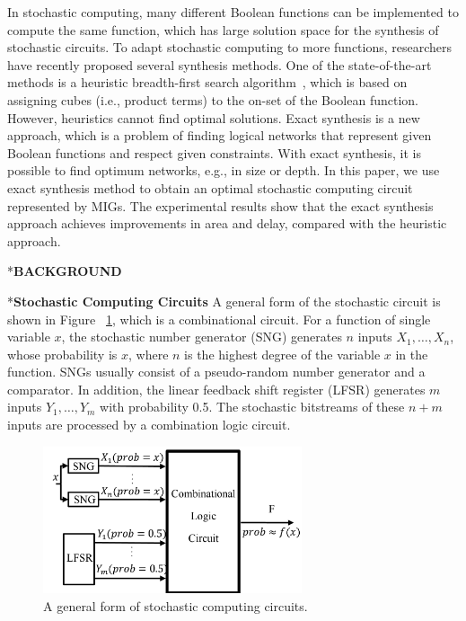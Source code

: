 \documentclass[conference,letterpaper]{IEEEtran}
\makeatletter
\renewcommand{\section}{\@startsection{section}{1}{0mm}
    {-\baselineskip}{0.001\baselineskip}{\bf\leftline}}
\renewcommand{\subsection}{\@startsection{subsection}{1}{0mm}
	{-\baselineskip}{0.001\baselineskip}{\bf\leftline}}
\makeatother
\begin{document}
In stochastic computing, many different Boolean functions can be implemented to compute the same function, which has large solution space for the synthesis of stochastic circuits. To adapt stochastic computing to more functions, researchers have recently proposed several synthesis methods. One of the state-of-the-art methods is a heuristic breadth-first search algorithm~\cite{2}, which is based on assigning
cubes (i.e., product terms) to the on-set of the Boolean function. However, heuristics cannot find optimal solutions. Exact synthesis is a new approach, which is a problem of finding logical networks that represent given Boolean functions and respect given constraints. With exact synthesis, it is possible to find optimum networks, e.g., in size or depth. In this paper, we use exact synthesis method to obtain an optimal stochastic computing circuit represented by MIGs. The experimental results show that the exact synthesis approach achieves improvements in area and delay, compared with the heuristic approach.
\vspace{2ex}

\section*{\textbf{\large BACKGROUND}}
\subsection*{\textbf{Stochastic Computing Circuits }}
A general form of the stochastic circuit is shown in Figure ~\ref{fig2}, which is a combinational circuit. For a function of single variable $x$, the stochastic number generator (SNG) generates $n$ inputs $X_{1}, \ldots, X_{n}$, whose probability is $x$, where $n$ is the highest degree of the variable $x$ in the function. SNGs usually consist of a pseudo-random number generator and a comparator. In addition, the linear feedback shift register (LFSR) generates $m$ inputs $Y_{1}, \ldots, Y_{m}$ with probability 0.5. The stochastic bitstreams of these $n+m$ inputs are processed by a combination logic circuit.

\begin{figure}[t]
	\centering
	\includegraphics[width=3in]{fig/sc.pdf}	
	\caption{\label{fig2}A general form of stochastic computing circuits.} \vspace{-2ex}
\end{figure}
\end{document}
